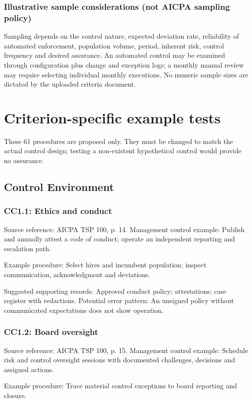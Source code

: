\documentclass[10pt,oneside]{report}
\begin{document}
\subsection{Illustrative sample considerations (not AICPA sampling policy)}
Sampling depends on the control nature, expected deviation rate, reliability of automated enforcement, population volume, period, inherent risk, control frequency and desired assurance. An automated control may be examined through configuration plus change and exception logs; a monthly manual review may require selecting individual monthly executions. No numeric sample sizes are dictated by the uploaded criteria document.

\chapter{Criterion-specific example tests}
These 61 procedures are proposed only. They must be changed to match the actual control design; testing a non-existent hypothetical control would provide no assurance.

\section{Control Environment}
\subsection*{CC1.1: Ethics and conduct}
Source reference: AICPA TSP 100, p. 14. Management control example: Publish and annually attest a code of conduct; operate an independent reporting and escalation path.

Example procedure: Select hires and incumbent population; inspect communication, acknowledgment and deviations.

Suggested supporting records: Approved conduct policy; attestations; case register with redactions. Potential error pattern: An unsigned policy without communicated expectations does not show operation.

\subsection*{CC1.2: Board oversight}
Source reference: AICPA TSP 100, p. 15. Management control example: Schedule risk and control oversight sessions with documented challenges, decisions and assigned actions.

Example procedure: Trace material control exceptions to board reporting and closure.
\end{document}
